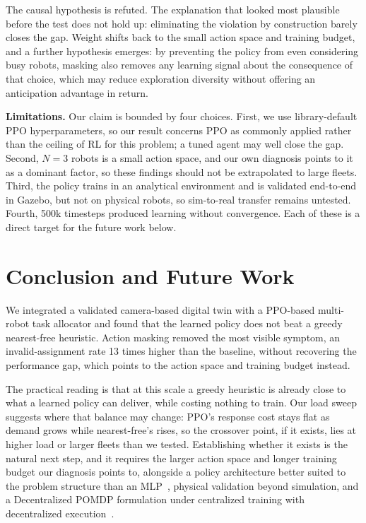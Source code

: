 \documentclass[conference]{IEEEtran}
\begin{document}
The causal hypothesis is refuted. The explanation that looked most plausible before the test does not hold up: eliminating the violation by construction barely closes the gap. Weight shifts back to the small action space and training budget, and a further hypothesis emerges: by preventing the policy from even considering busy robots, masking also removes any learning signal about the consequence of that choice, which may reduce exploration diversity without offering an anticipation advantage in return.

\textbf{Limitations.} Our claim is bounded by four choices. First, we use library-default PPO hyperparameters, so our result concerns PPO as commonly applied rather than the ceiling of RL for this problem; a tuned agent may well close the gap. Second, $N=3$ robots is a small action space, and our own diagnosis points to it as a dominant factor, so these findings should not be extrapolated to large fleets. Third, the policy trains in an analytical environment and is validated end-to-end in Gazebo, but not on physical robots, so sim-to-real transfer remains untested. Fourth, 500k timesteps produced learning without convergence. Each of these is a direct target for the future work below.

\section{Conclusion and Future Work}

We integrated a validated camera-based digital twin with a PPO-based multi-robot task allocator and found that the learned policy does not beat a greedy nearest-free heuristic. Action masking removed the most visible symptom, an invalid-assignment rate 13 times higher than the baseline, without recovering the performance gap, which points to the action space and training budget instead.

The practical reading is that at this scale a greedy heuristic is already close to what a learned policy can deliver, while costing nothing to train. Our load sweep suggests where that balance may change: PPO's response cost stays flat as demand grows while nearest-free's rises, so the crossover point, if it exists, lies at higher load or larger fleets than we tested. Establishing whether it exists is the natural next step, and it requires the larger action space and longer training budget our diagnosis points to, alongside a policy architecture better suited to the problem structure than an MLP~\cite{agrawal2023rtaw,paul2022capsule}, physical validation beyond simulation, and a Decentralized POMDP formulation under centralized training with decentralized execution~\cite{lowe2017multi}.
\end{document}
